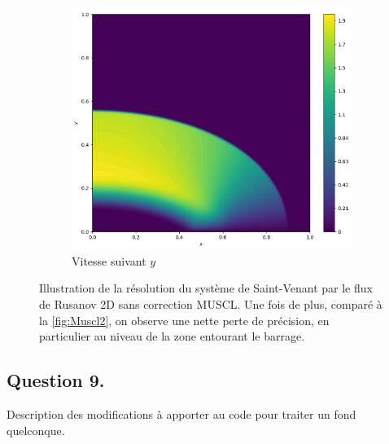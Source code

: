 \documentclass[
	french,
	11pt, %
]{fphw}
\begin{document}
\begin{figure}[H]
\begin{subfigure}{0.32\textwidth}
		\label{fig:Rusa4u}
	\end{subfigure}
	\begin{subfigure}{0.32\textwidth}
		\centering
		\includegraphics[width=\textwidth,height=0.85\textwidth]{Rusa4v.png}
		\caption{Vitesse suivant $y$}
		\label{fig:Rusa4v}
	\end{subfigure}
	\caption{Illustration de la résolution du système de Saint-Venant par le flux de Rusanov 2D sans correction MUSCL. Une fois de plus, comparé à la \cref{fig:Muscl2}, on observe une nette perte de précision, en particulier au niveau de la zone entourant le barrage.}
	\label{fig:Rusa4}
\end{figure}


\subsection*{Question 9.}

\begin{problem}
	Description des modifications à apporter au code pour traiter un fond quelconque.
\end{problem}
\end{document}
